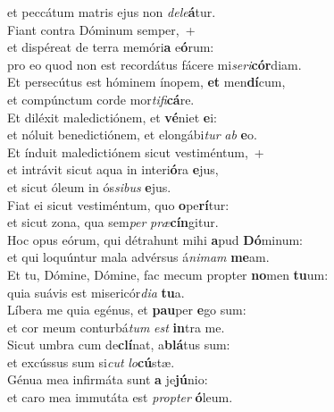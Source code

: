 \oddverse et peccátum matris ejus non \textit{de}\textit{le}\textbf{á}tur.\\
\evenverse Fiant contra Dóminum semper,~+\\
\evenverse  et dispéreat de terra memóri\textbf{a} e\textbf{ó}rum:~\*\\
\evenverse pro eo quod non est recordátus fácere mi\textit{se}\textit{ri}\textbf{cór}diam.\\
\oddverse Et persecútus est hóminem ínopem, \textbf{et} men\textbf{dí}cum,~\*\\
\oddverse et compúnctum corde mor\textit{ti}\textit{fi}\textbf{cá}re.\\
\evenverse Et diléxit maledictiónem, et \textbf{vé}niet \textbf{e}i:~\*\\
\evenverse et nóluit benedictiónem, et elongábi\textit{tur} \textit{ab} \textbf{e}o.\\
\oddverse Et índuit maledictiónem sicut vestiméntum,~+\\
\oddverse  et intrávit sicut aqua in interi\textbf{ó}ra \textbf{e}jus,~\*\\
\oddverse et sicut óleum in ós\textit{si}\textit{bus} \textbf{e}jus.\\
\evenverse Fiat ei sicut vestiméntum, quo \textbf{o}pe\textbf{rí}tur:~\*\\
\evenverse et sicut zona, qua sem\textit{per} \textit{præ}\textbf{cín}gitur.\\
\oddverse Hoc opus eórum, qui détrahunt mihi \textbf{a}pud \textbf{Dó}minum:~\*\\
\oddverse et qui loquúntur mala advérsus á\textit{ni}\textit{mam} \textbf{me}am.\\
\evenverse Et tu, Dómine, Dómine, fac mecum propter \textbf{no}men \textbf{tu}um:~\*\\
\evenverse quia suávis est misericór\textit{di}\textit{a} \textbf{tu}a.\\
\oddverse Líbera me quia egénus, et \textbf{pau}per \textbf{e}go sum:~\*\\
\oddverse et cor meum conturbá\textit{tum} \textit{est} \textbf{in}tra me.\\
\evenverse Sicut umbra cum de\textbf{clí}nat, a\textbf{blá}tus sum:~\*\\
\evenverse et excússus sum si\textit{cut} \textit{lo}\textbf{cú}stæ.\\
\oddverse Génua mea infirmáta sunt \textbf{a} je\textbf{jú}nio:~\*\\
\oddverse et caro mea immutáta est \textit{prop}\textit{ter} \textbf{ó}leum.\\
